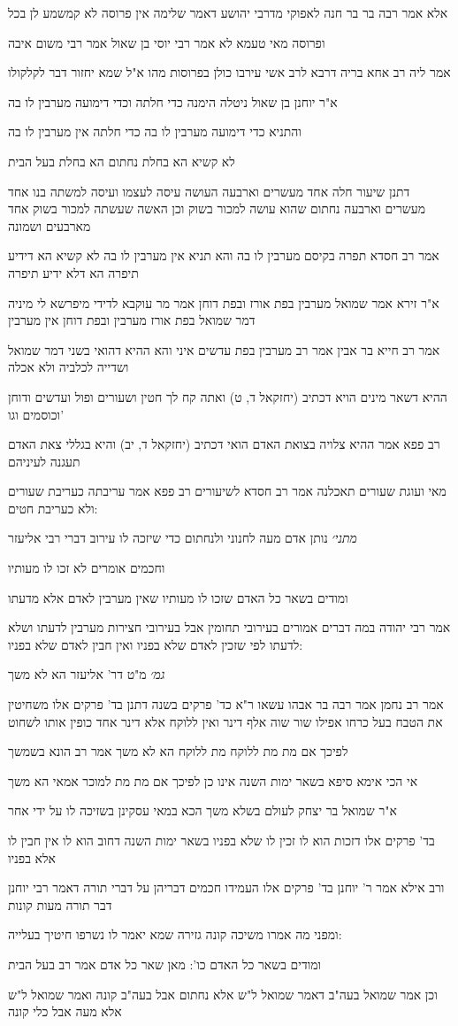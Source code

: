 \documentclass[12pt, openany]{book}
\newcommand{\sethebfont}{
\fontsize{10.5pt}{21.0pt} \selectfont
}
\newcommand{\textblock}[1]{
{\sethebfont #1\\}	
}
\begin{document}
\textblock{אלא אמר רבה בר בר חנה לאפוקי מדרבי יהושע דאמר שלימה אין פרוסה לא קמשמע לן בכל}
\textblock{ופרוסה מאי טעמא לא אמר רבי יוסי בן שאול אמר רבי משום איבה}
\textblock{אמר ליה רב אחא בריה דרבא לרב אשי עירבו כולן בפרוסות מהו א"ל שמא יחזור דבר לקלקולו}
\textblock{א"ר יוחנן בן שאול ניטלה הימנה כדי חלתה וכדי דימועה מערבין לו בה}
\textblock{והתניא כדי דימועה מערבין לו בה כדי חלתה אין מערבין לו בה}
\textblock{לא קשיא הא בחלת נחתום הא בחלת בעל הבית}
\textblock{דתנן שיעור חלה אחד מעשרים וארבעה העושה עיסה לעצמו ועיסה למשתה בנו אחד מעשרים וארבעה נחתום שהוא עושה למכור בשוק וכן האשה שעשתה למכור בשוק אחד מארבעים ושמונה}
\textblock{אמר רב חסדא תפרה בקיסם מערבין לו בה והא תניא אין מערבין לו בה לא קשיא הא דידיע תיפרה הא דלא ידיע תיפרה}
\textblock{א"ר זירא אמר שמואל מערבין בפת אורז ובפת דוחן אמר מר עוקבא לדידי מיפרשא לי מיניה דמר שמואל בפת אורז מערבין ובפת דוחן אין מערבין}
\textblock{אמר רב חייא בר אבין אמר רב מערבין בפת עדשים איני והא ההיא דהואי בשני דמר שמואל ושדייה לכלביה ולא אכלה}
\textblock{ההיא דשאר מינים הויא דכתיב (יחזקאל ד, ט) ואתה קח לך חטין ושעורים ופול ועדשים ודוחן וכוסמים וגו'}
\textblock{רב פפא אמר ההיא צלויה בצואת האדם הואי דכתיב (יחזקאל ד, יב) והיא בגללי צאת האדם תעגנה לעיניהם}
\textblock{מאי ועוגת שעורים תאכלנה אמר רב חסדא לשיעורים רב פפא אמר עריבתה כעריבת שעורים ולא כעריבת חטים:}
\textblock{{\large\emph{מתני׳}} נותן אדם מעה לחנוני ולנחתום כדי שיזכה לו עירוב דברי רבי אליעזר}
\textblock{וחכמים אומרים לא זכו לו מעותיו}
\textblock{ומודים בשאר כל האדם שזכו לו מעותיו שאין מערבין לאדם אלא מדעתו}
\textblock{אמר רבי יהודה במה דברים אמורים בעירובי תחומין אבל בעירובי חצירות מערבין לדעתו ושלא לדעתו לפי שזכין לאדם שלא בפניו ואין חבין לאדם שלא בפניו:}
\textblock{{\large\emph{גמ׳}} מ"ט דר' אליעזר הא לא משך}
\textblock{אמר רב נחמן אמר רבה בר אבהו עשאו ר"א כד' פרקים בשנה דתנן בד' פרקים אלו משחיטין את הטבח בעל כרחו אפילו שור שוה אלף דינר ואין ללוקח אלא דינר אחד כופין אותו לשחוט}
\textblock{לפיכך אם מת מת ללוקח מת ללוקח הא לא משך אמר רב הונא בשמשך}
\textblock{אי הכי אימא סיפא בשאר ימות השנה אינו כן לפיכך אם מת מת למוכר אמאי הא משך}
\textblock{א"ר שמואל בר יצחק לעולם בשלא משך הכא במאי עסקינן בשזיכה לו על ידי אחר}
\textblock{בד' פרקים אלו דזכות הוא לו זכין לו שלא בפניו בשאר ימות השנה דחוב הוא לו אין חבין לו אלא בפניו}
\textblock{ורב אילא אמר ר' יוחנן בד' פרקים אלו העמידו חכמים דבריהן על דברי תורה דאמר רבי יוחנן דבר תורה מעות קונות}
\textblock{ומפני מה אמרו משיכה קונה גזירה שמא יאמר לו נשרפו חיטיך בעלייה:}
\textblock{ומודים בשאר כל האדם כו': מאן שאר כל אדם אמר רב בעל הבית}
\textblock{וכן אמר שמואל בעה"ב דאמר שמואל ל"ש אלא נחתום אבל בעה"ב קונה ואמר שמואל ל"ש אלא מעה אבל כלי קונה}
\end{document}
